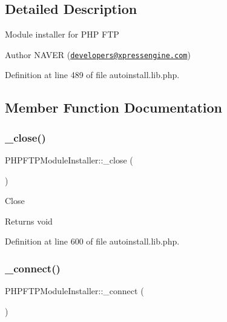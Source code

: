 \subsection{Detailed Description}
Module installer for P\+HP F\+TP \begin{DoxyAuthor}{Author}
N\+A\+V\+ER (\href{mailto:developers@xpressengine.com}{\tt developers@xpressengine.\+com}) 
\end{DoxyAuthor}


Definition at line 489 of file autoinstall.\+lib.\+php.



\subsection{Member Function Documentation}
\hypertarget{classPHPFTPModuleInstaller_aa50f708fe4f367338fc95303e9425f83}{}\label{classPHPFTPModuleInstaller_aa50f708fe4f367338fc95303e9425f83} 
\subsubsection{\texorpdfstring{\+\_\+close()}{\_close()}}
{\footnotesize\ttfamily P\+H\+P\+F\+T\+P\+Module\+Installer\+::\+\_\+close (\begin{DoxyParamCaption}{ }\end{DoxyParamCaption})}

Close

\begin{DoxyReturn}{Returns}
void 
\end{DoxyReturn}


Definition at line 600 of file autoinstall.\+lib.\+php.

\hypertarget{classPHPFTPModuleInstaller_a17bd035c8cc7030a56feedf6562de616}{}\label{classPHPFTPModuleInstaller_a17bd035c8cc7030a56feedf6562de616} 
\subsubsection{\texorpdfstring{\+\_\+connect()}{\_connect()}}
{\footnotesize\ttfamily P\+H\+P\+F\+T\+P\+Module\+Installer\+::\+\_\+connect (\begin{DoxyParamCaption}{ }\end{DoxyParamCaption})}


